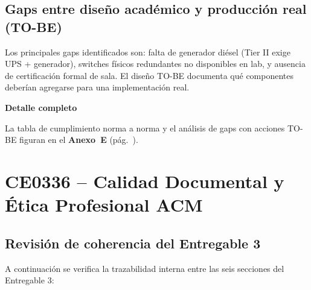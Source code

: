 \documentclass[11pt, a4paper, oneside]{report}
\newenvironment{notabox}[1]{%
  \begin{lrbox}{\notaboxsb}%
  \begin{minipage}{\dimexpr\textwidth-2\fboxsep\relax}%
  \vspace{4pt}\textcolor{upeu_dark}{\textbf{#1}}\\[2pt]\small%
}{%
  \vspace{4pt}%
  \end{minipage}%
  \end{lrbox}%
  \vspace{6pt}\par\noindent\colorbox{upeu_light}{\usebox{\notaboxsb}}\par\vspace{6pt}%
}
\begin{document}
\section{Gaps entre diseño académico y producción real (TO-BE)}

Los principales gaps identificados son: falta de generador diésel (Tier II exige UPS + generador), switches físicos redundantes no disponibles en lab, y ausencia de certificación formal de sala. El diseño TO-BE documenta qué componentes deberían agregarse para una implementación real.

\begin{notabox}{Detalle completo}
La tabla de cumplimiento norma a norma y el análisis de gaps con acciones TO-BE figuran en el \textbf{Anexo~E} (pág.~\pageref{anex:cumplimiento}).
\end{notabox}
\chapter{CE0336 -- Calidad Documental y Ética Profesional ACM}


\section{Revisión de coherencia del Entregable 3}

A continuación se verifica la trazabilidad interna entre las seis secciones del Entregable 3:
\end{document}
